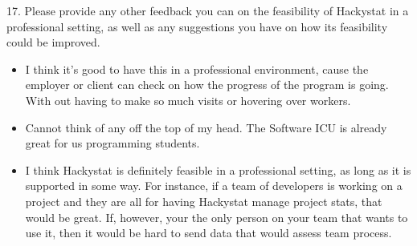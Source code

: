 \documentclass[11pt]{article}
\begin{document}
17. Please provide any other feedback you can on the feasibility of Hackystat in a professional setting, as well as any suggestions you have on how its feasibility could be improved.
\begin{itemize}
\item I think it's good to have this in a professional environment, cause the employer or client  can check on how the progress of the program is going. With out having to make so much visits or hovering over workers.
\item Cannot think of any off the top of my head.  The Software ICU is already great for us programming students.  
\item I think Hackystat is definitely feasible in a professional setting, as long as it is supported in some way. For instance, if a team of developers is working on a project and they are all for having Hackystat manage project stats, that would be great. If, however, your the only person on your team that wants to use it, then it would be hard to send data that would assess team process.


\end{itemize}
\end{document}
